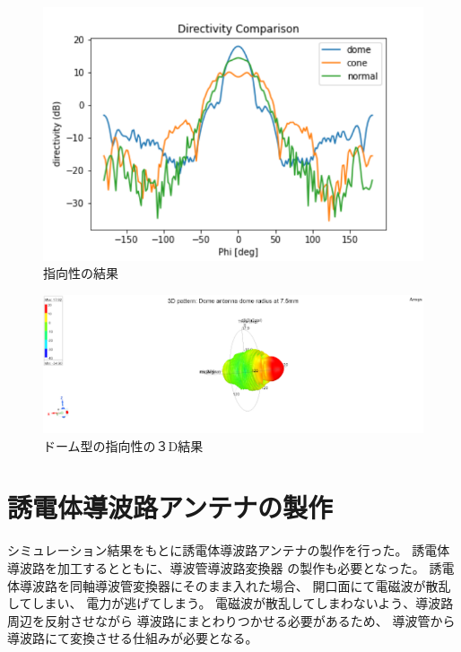\documentclass[technicalreport]{ieicej}
\begin{document}
\begin{figure}[tb]
  \begin{center}
    \includegraphics[bb=0 0 324 216, width=1.0\linewidth]{img/directivity.pdf}
    \caption{指向性の結果}
    \label{fig:directivity_results}
  \end{center}
\end{figure}

\begin{figure}[tb]
  \begin{center}
    \includegraphics[bb=0 0 324 216, width=1.0\linewidth]{img/dome_directivity.pdf}
    \caption{ドーム型の指向性の３D結果}
    \label{fig:dome_3d_directivity_results}
  \end{center}
\end{figure}


\section{誘電体導波路アンテナの製作}

シミュレーション結果をもとに誘電体導波路アンテナの製作を行った。
誘電体導波路を加工するとともに、導波管導波路変換器
の製作も必要となった。
誘電体導波路を同軸導波管変換器にそのまま入れた場合、
開口面にて電磁波が散乱してしまい、
電力が逃げてしまう。
電磁波が散乱してしまわないよう、導波路周辺を反射させながら
導波路にまとわりつかせる必要があるため、
導波管から導波路にて変換させる仕組みが必要となる。
\end{document}
